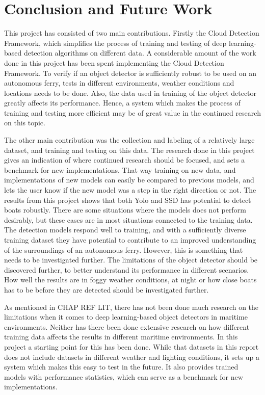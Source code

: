 \chapter{Conclusion and Future Work}

This project has consisted of two main contributions. Firstly the Cloud Detection Framework, which simplifies the process of training and testing of deep learning-based detection algorithms on different data. A considerable amount of the work done in this project has been spent implementing the Cloud Detection Framework. To verify if an object detector is sufficiently robust to be used on an autonomous ferry, tests in different environments, weather conditions and locations needs to be done. Also, the data used in training of the object detector greatly affects its performance. Hence, a system which makes the process of training and testing more efficient may be of great value in the continued research on this topic.

\vspace{3mm}

The other main contribution was the collection and labeling of a relatively large dataset, and training and testing on this data. The research done in this project gives an indication of where continued research should be focused, and sets a benchmark for new implementations. That way training on new data, and implementations of new models can easily be compared to previous models, and lets the user know if the new model was a step in the right direction or not. The results from this project shows that both Yolo and SSD has potential to detect boats robustly. There are some situations where the models does not perform desirably, but these cases are in most situations connected to the training data. The detection models respond well to training, and with a sufficiently diverse training dataset they have potential to contribute to an improved understanding of the surroundings of an autonomous ferry. However, this is something that needs to be investigated further. The limitations of the object detector should be discovered further, to better understand its performance in different scenarios. How well the results are in foggy weather conditions, at night or how close boats has to be before they are detected should be investigated further. 

\vspace{3mm}

As mentioned in CHAP REF LIT, there has not been done much research on the limitations when it comes to deep learning-based object detectors in maritime environments. Neither has there been done extensive research on how different training data affects the results in different maritime environments. In this project a starting point for this has been done. While that datasets in this report does not include datasets in different weather and lighting conditions, it sets up a system which makes this easy to test in the future. It also provides trained models with performance statistics, which can serve as a benchmark for new implementations.

